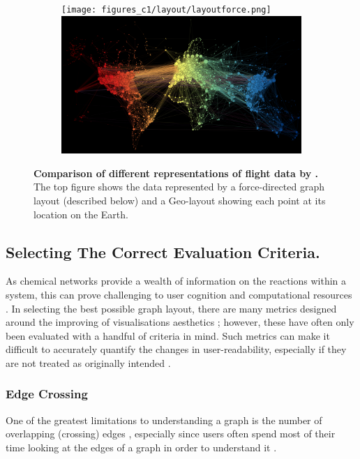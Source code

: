 \begin{figure}[H]
     \centering
      \begin{subfigure}[b,black]{.9\textwidth}
         \centering
     \texttt{[image: figures\_c1/layout/layoutforce.png]}
     \includegraphics[width=\textwidth]{figures_c1/layout/layoutgeo.png}
     \end{subfigure}
        \caption{\textbf{Comparison of different representations of flight data by \citep{worldmap}.} The top figure shows the data represented by a force-directed graph layout (described below) and a Geo-layout showing each point at its location on the Earth.}
        \label{fig:worldmap}
\end{figure}


\subsection{Selecting The Correct Evaluation Criteria.}
As chemical networks provide a wealth of information on the reactions within a system, this can prove challenging to user cognition and computational resources \citep{ch1}. In selecting the best possible graph layout, there are many metrics designed around the improving of visualisations aesthetics \citep{metricgraphaesthetics}; however, these have often only been evaluated with a handful of criteria in mind. Such metrics can make it difficult to accurately quantify the changes in user-readability, especially if they are not treated as originally intended \citep{eyetrack}.


\subsubsection{Edge Crossing} \label{sec:edgecross}
One of the greatest limitations to understanding a graph is the number of overlapping (crossing) edges \citep{humanaesthetic}, especially since users often spend most of their time looking at the edges of a graph in order to understand it \citep{eyetrack}.

